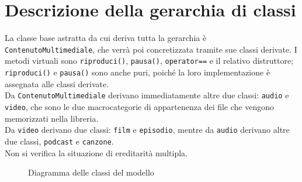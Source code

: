 \documentclass[a4paper,10pt]{article}
\begin{document}
\section{Descrizione della gerarchia di classi}
La classe base astratta da cui deriva tutta la gerarchia è \texttt{ContenutoMultimediale}, che verrà poi concretizzata tramite sue classi derivate. I metodi virtuali sono \texttt{riproduci()}, \texttt{pausa()}, \texttt{operator==} e il relativo distruttore; \texttt{riproduci()} e \texttt{pausa()} sono anche puri, poiché la loro implementazione è assegnata alle classi derivate. \\
Da \texttt{ContenutoMultimediale} derivano immediatamente altre due classi: \texttt{audio} e \texttt{video}, che sono le due macrocategorie di appartenenza dei file che vengono memorizzati nella libreria. \\
Da \texttt{video} derivano due classi: \texttt{film} e \texttt{episodio}, mentre da \texttt{audio} derivano altre due classi, \texttt{podcast} e \texttt{canzone}. \\
Non si verifica la situazione di ereditarità multipla. \\
\begin{figure}[!htb]
	\caption{\label{fig:my-label} Diagramma delle classi del modello}
\end{figure}
\end{document}
